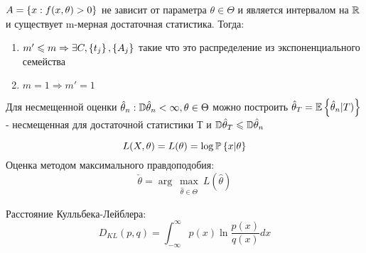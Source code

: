 \begin{theorem}
$A = \left\{ x: f(x, \theta) > 0 \right\}$ не зависит от параметра $\theta \in \Theta$ и является интервалом на $\mathbb{R}$ и существует m-мерная достаточная статистика. Тогда: 
\begin{enumerate}
	\item $ m' \leqslant m \Rightarrow \exists C, \left\{ t_j \right\}, \left\{ A_j \right\}$ такие что это распределение из экспоненциального семейства
	\item $ m=1 \Rightarrow m'=1$
\end{enumerate}
\end{theorem}

\begin{theorem}
Для несмещенной оценки $\hat{\theta}_n: \mathbb{D}\hat{\theta}_n < \infty, \theta \in \Theta$ можно построить $\hat{\theta}_T = \mathbb{E}\left\{ \hat{\theta}_n|T) \right\}$ - несмещенная для достаточной статистики Т и $ \mathbb{D}\hat{\theta}_T \leqslant \mathbb{D}\hat{\theta}_n $
\end{theorem}

$$ L(X,\theta) = L(\theta) = \log \mathbb{P}\left\{ x|\theta \right\} $$
Оценка методом максимального правдоподобия: $$ \check{\theta} = \arg \max_{\substack{\hat{\theta} \in \Theta}}L(\hat{\theta}) $$

\begin{definition}
Расстояние Кулльбека-Лейблера: $$ D_{KL}(p,q) = \int_{-\infty}^{\infty}p(x) \ln \frac{p(x)}{q(x)} dx $$
\end{definition}